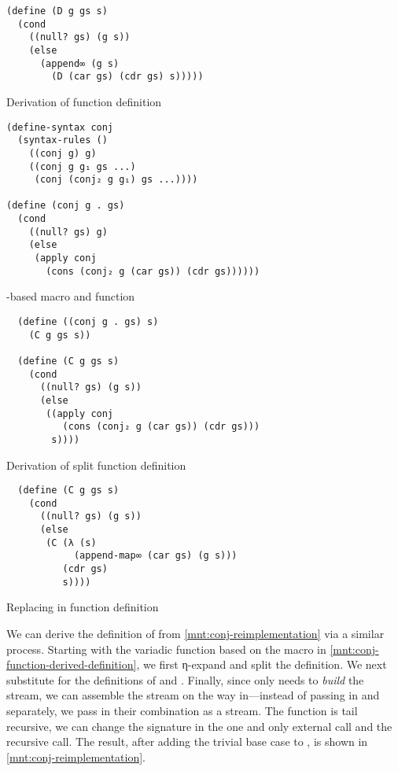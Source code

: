 \documentclass[sigplan,draft,balance,pbalance,natbib=false]{acmart}
\begin{document}
\begin{listing}
\begin{verbatim}
(define (D g gs s)
  (cond
    ((null? gs) (g s))
    (else
      (append∞ (g s)
        (D (car gs) (cdr gs) s)))))
\end{verbatim}
  \caption{Derivation of  function definition}
  \label{mnt:disj-substituted-through}
\end{listing}

\begin{listing}
\begin{verbatim}
(define-syntax conj
  (syntax-rules ()
    ((conj g) g)
    ((conj g g₁ gs ...)
     (conj (conj₂ g g₁) gs ...))))

(define (conj g . gs)
  (cond
    ((null? gs) g)
    (else
     (apply conj
       (cons (conj₂ g (car gs)) (cdr gs))))))
\end{verbatim}
  \caption{-based  macro and function}
  \label{mnt:conj-function-derived-definition}
\end{listing}

\begin{listing}
\begin{verbatim}
  (define ((conj g . gs) s)
    (C g gs s))

  (define (C g gs s)
    (cond
      ((null? gs) (g s))
      (else
       ((apply conj
          (cons (conj₂ g (car gs)) (cdr gs)))
        s))))
\end{verbatim}
  \caption{Derivation of split  function definition}
  \label{mnt:conj-substituted-through}
\end{listing}

\begin{listing}
\begin{verbatim}
  (define (C g gs s)
    (cond
      ((null? gs) (g s))
      (else
       (C (λ (s)
            (append-map∞ (car gs) (g s)))
          (cdr gs)
          s))))
\end{verbatim}
  \caption{Replacing  in  function definition}
  \label{mnt:C-substituted-through}
\end{listing}

We can derive the definition of  from
\cref{mnt:conj-reimplementation} via a similar process. Starting with
the variadic function based on the macro in
\cref{mnt:conj-function-derived-definition}, we first η-expand and
split the definition. We next substitute for the definitions
of  and . Finally,
since  only needs  to \emph{build} the
stream, we can assemble the stream on the way in---instead of passing
in  and  separately, we pass in their
combination as a stream. The function is tail recursive, we can change
the signature in the one and only external call and the recursive
call. The result, after adding the trivial base case
to , is shown in \cref{mnt:conj-reimplementation}.
\end{document}
